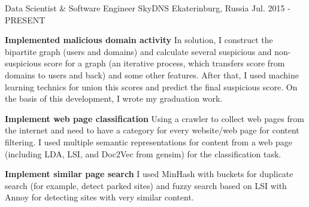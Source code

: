


\begin{cventries}


\cventry
{Data Scientist \& Software Engineer} %
{SkyDNS} %
{Ekaterinburg, Russia} %
{Jul. 2015 - PRESENT} %
{ %
\begin{cvitems}
\item {\textbf{Implemented malicious domain activity} \newline In solution, I construct the bipartite graph (users and domains) and calculate several suspicious and non-suspicious score for a graph (an iterative process, which transfers score from domains to users and back) and some other features. After that, I used machine learning technics for union this scores and predict the final suspicious score. On the basis of this development, I wrote my graduation work.}
\item {\textbf{Implement web page classification} \newline Using a crawler to collect web pages from the internet and need to have a category for every website/web page for content filtering. I used multiple semantic representations for content from a web page  (including LDA, LSI, and Doc2Vec from gensim) for the classification task.}
\item {\textbf{Implement similar page search} \newline I used MinHash with buckets for duplicate search (for example, detect parked sites) and fuzzy search based on LSI with Annoy for detecting sites with very similar content.}
\end{cvitems}
}


\end{cventries}